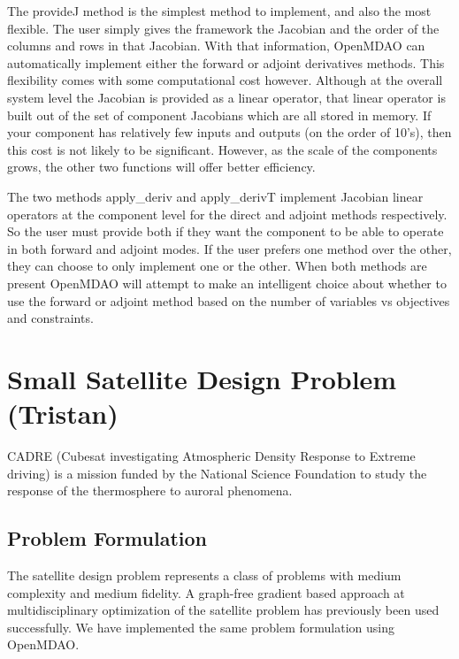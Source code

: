 \documentclass[]{aiaa-tc} %
\begin{document}
        The provideJ method is the simplest method to implement, and also the most flexible. The user simply gives the framework the
        Jacobian and the order of the columns and rows in that Jacobian. With that information, OpenMDAO can automatically
        implement either the forward or adjoint derivatives methods. This flexibility comes with some computational cost however.
        Although at the overall system level the Jacobian is provided as a linear operator, that linear operator is built out
        of the set of component Jacobians which are all stored in memory. If your component has relatively few inputs and outputs
        (on the order of 10's), then this cost is not likely to be significant. However, as the scale of the components grows,
        the other two functions will offer better efficiency.

        The two methods apply\_deriv and apply\_derivT implement Jacobian linear operators at
        the component level for the direct and adjoint methods respectively. So the user must provide both if they
        want the component to be able to operate in both forward and adjoint modes. If the user prefers one method over
        the other, they can choose to only implement one or the other. When both methods are present OpenMDAO will
        attempt to make an intelligent choice about whether to use the forward or adjoint method based on the number
        of variables vs objectives and constraints.



  \section{Small Satellite Design Problem (Tristan)}

  CADRE (Cubesat investigating Atmospheric Density Response to Extreme driving)
  is a mission funded by the National Science Foundation to study the
  response of the thermosphere to auroral phenomena\cite{cutler2011cubesat}.

    \subsection{Problem Formulation}

      The satellite design problem represents a class of problems with medium complexity and medium fidelity.
      A graph-free gradient based approach at multidisciplinary optimization of the satellite
      problem has previously been used successfully\cite{CADRE2012}. We have implemented
      the same problem formulation using OpenMDAO.
\end{document}
